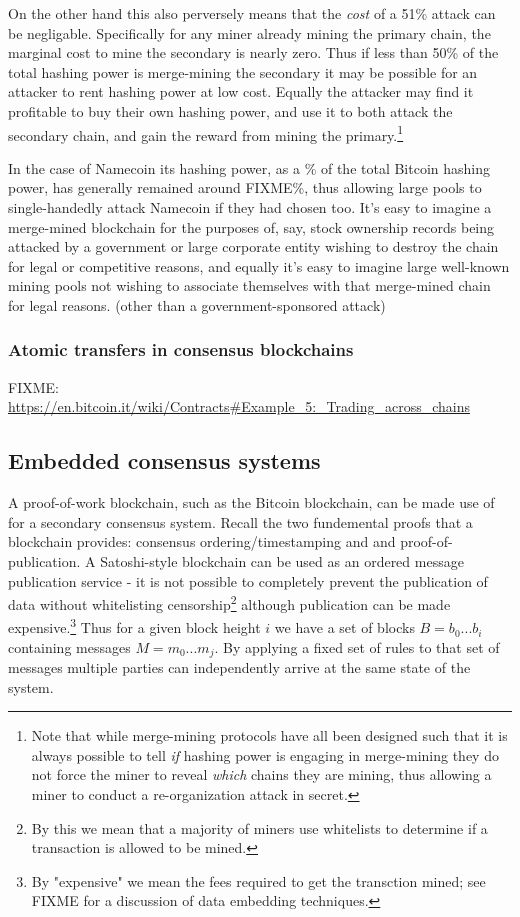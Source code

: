 \documentclass{article}
\begin{document}
On the other hand this also perversely means that the \emph{cost} of a 51\%
attack can be negligable. Specifically for any miner already mining the primary
chain, the marginal cost to mine the secondary is nearly zero.  Thus if less
than 50\% of the total hashing power is merge-mining the secondary it may be
possible for an attacker to rent hashing power at low cost. Equally the
attacker may find it profitable to buy their own hashing power, and use it to
both attack the secondary chain, and gain the reward from mining the
primary.\footnote{Note that while merge-mining protocols have all been designed
such that it is always possible to tell \emph{if} hashing power is engaging in
merge-mining they do not force the miner to reveal \emph{which} chains they are
mining, thus allowing a miner to conduct a re-organization attack in secret.}

In the case of Namecoin its hashing power, as a \% of the total Bitcoin hashing
power, has generally remained around FIXME\%, thus allowing large pools to
single-handedly attack Namecoin if they had chosen too. It's easy to imagine a
merge-mined blockchain for the purposes of, say, stock ownership records being
attacked by a government or large corporate entity wishing to destroy the chain
for legal or competitive reasons, and equally it's easy to imagine large
well-known mining pools not wishing to associate themselves with that
merge-mined chain for legal reasons. (other than a government-sponsored attack)


\subsubsection{Atomic transfers in consensus blockchains}

FIXME: \url{https://en.bitcoin.it/wiki/Contracts#Example_5:_Trading_across_chains}


\subsection{Embedded consensus systems}

A proof-of-work blockchain, such as the Bitcoin blockchain, can be made use of
for a secondary consensus system. Recall the two fundemental
proofs that a blockchain provides: consensus ordering/timestamping and and
proof-of-publication. A Satoshi-style blockchain can be used as an ordered
message publication service - it is not possible to completely prevent the
publication of data without whitelisting censorship\footnote{By this we mean
    that a majority of miners use whitelists to determine if a transaction is
allowed to be mined.} although publication can be made expensive.\footnote{By
"expensive" we mean the fees required to get the transction mined; see FIXME
for a discussion of data embedding techniques.} Thus for a given block height
$i$ we have a set of blocks $B={b_0 ... b_i}$ containing messages $M={m_0 ...
m_j}$. By applying a fixed set of rules to that set of messages multiple
parties can independently arrive at the same state of the system.
\end{document}
